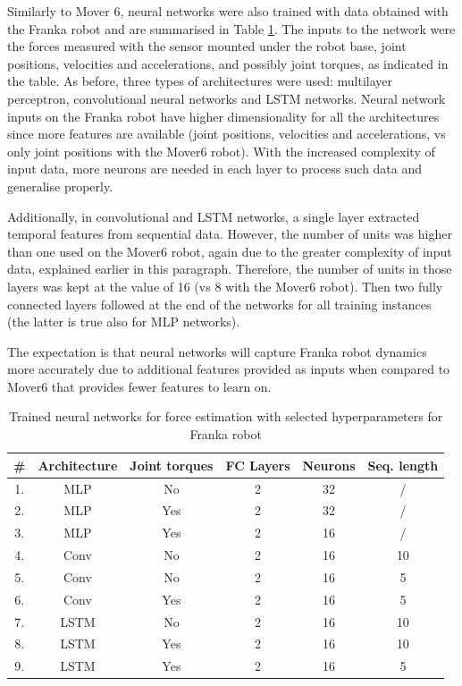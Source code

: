 Similarly to Mover 6, neural networks were also trained with data obtained with the Franka robot and are summarised in Table \ref{tab:NetworksFranka}. The inputs to the network were the forces measured with the sensor mounted under the robot base, joint positions, velocities and accelerations, and possibly joint torques, as indicated in the table. As before, three types of architectures were used: multilayer perceptron, convolutional neural networks and LSTM networks. Neural network inputs on the Franka robot have higher dimensionality for all the architectures since more features are available (joint positions, velocities and accelerations, vs only joint positions with the Mover6 robot). With the increased complexity of input data, more neurons are needed in each layer to process such data and generalise properly.

Additionally, in convolutional and LSTM networks, a single layer extracted temporal features from sequential data. However, the number of units was higher than one used on the Mover6 robot, again due to the greater complexity of input data, explained earlier in this paragraph. Therefore, the number of units in those layers was kept at the value of 16 (vs 8 with the Mover6 robot). Then two fully connected layers followed at the end of the networks for all training instances (the latter is true also for MLP networks).

The expectation is that neural networks will capture Franka robot dynamics more accurately due to additional features provided as inputs when compared to Mover6 that provides fewer features to learn on.

\begin{table}
    \centering
    \caption{Trained neural networks for force estimation with selected hyperparameters for Franka robot}
    \label{tab:NetworksFranka}
    \begin{tabular}{cccccc}
        \toprule
        \textbf{\#} & \textbf{Architecture} & \textbf{Joint torques} & \textbf{FC Layers} & \textbf{Neurons} & \textbf{Seq. length}  \\
        \midrule
        1. & MLP & No & 2 & 32 & / \\ %
        2. & MLP & Yes & 2 & 32 & / \\ %
        3. & MLP & Yes & 2 & 16 & / \\ %
        4. & Conv & No & 2 & 16 & 10 \\ %
        5. & Conv & No & 2 & 16 & 5\\ %
        6. & Conv & Yes & 2 & 16 & 5 \\ %
        7. & LSTM & No & 2 & 16 & 10 \\ %
        8. & LSTM & Yes & 2 & 16 & 10 \\ %
        9. & LSTM & Yes & 2 & 16 & 5\\ %
        \bottomrule
    \end{tabular}
\end{table}

